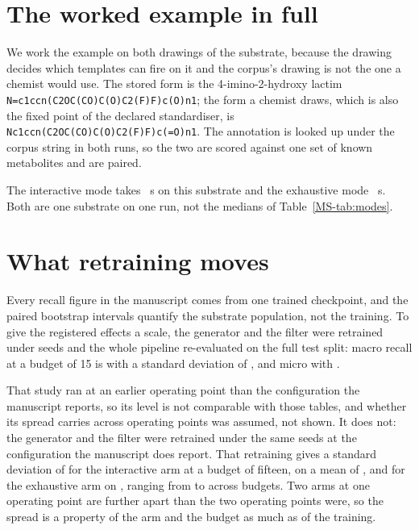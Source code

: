 \documentclass[journal=jcisd8,manuscript=suppinfo,layout=onecolumn]{achemso}
\begin{document}
\section{The worked example in full}
\label{sec:si-case}

We work the example on both drawings of the substrate, because the drawing decides which
templates can fire on it and the corpus's drawing is not the one a chemist would use. The stored
form is the 4-imino-2-hydroxy lactim
\texttt{N=c1ccn(C2OC(CO)C(O)C2(F)F)c(O)n1}; the form a chemist draws, which is also the fixed
point of the declared standardiser, is \texttt{Nc1ccn(C2OC(CO)C(O)C2(F)F)c(=O)n1}. The
annotation is looked up under the corpus string in both runs, so the two are scored against one set of known metabolites and are paired.

The interactive mode takes \numCaseInterSeconds~s on this substrate and the exhaustive mode
\numCaseExhSeconds~s. Both are one substrate on one run, not the medians of
Table~\ref{MS-tab:modes}.



\section{What retraining moves}
\label{sec:si-retrain}

Every recall figure in the manuscript comes from one trained checkpoint, and the paired bootstrap
intervals quantify the substrate population, not the training. To give the registered
effects a scale, the generator and the filter were retrained under \numSeedN{} seeds and the
whole pipeline re-evaluated on the full test split: macro recall at a budget of 15 is
\numSeedMacroMean{} with a standard deviation of \numSeedMacroStd{}, and micro
\numSeedMicroMean{} with \numSeedMicroStd{}.

That study ran at an earlier operating point than the configuration the manuscript reports, so
its level is not comparable with those tables, and whether its spread carries across operating
points was assumed, not shown. It does not: the generator and the filter were retrained under the
same \numSpreadSeeds{} seeds at the configuration the manuscript does report. That retraining gives
a standard deviation of \numSpreadInteractiveSd{} for the interactive arm at a budget of fifteen,
on a mean of \numSpreadInteractiveMean{}, and \numSpreadExhaustiveSd{} for the exhaustive arm on
\numSpreadExhaustiveMean{}, ranging from \numSpreadInteractiveSdmin{} to
\numSpreadExhaustiveSdmax{} across budgets. Two arms at one operating point are further apart than
the two operating points were, so the spread is a property of the arm and the budget as much as of
the training.
\end{document}
